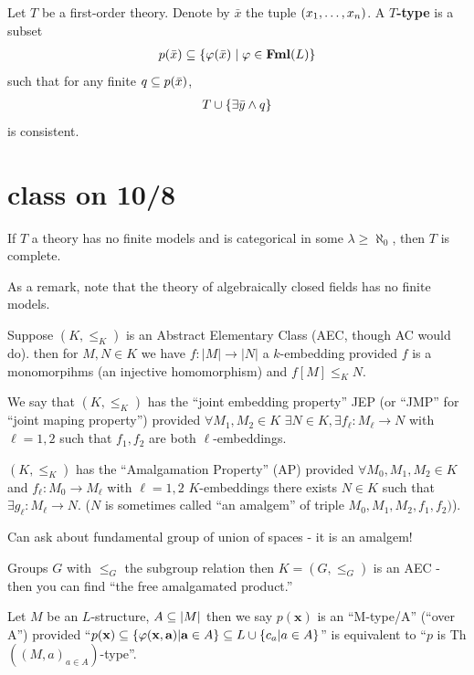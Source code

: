 \begin{boxdefinition}[$T$-Type]
    Let $T$ be a first-order theory. Denote by $\bar{x}$ the tuple $\left( x_1, \ldots, x_n \right)$. A \textbf{$T$-type} is a subset
    \begin{align*}
        p\!\left( \bar{x} \right) \subseteq \left\{ \varphi\!\left( \bar{x} \right) \; \middle\vert \; \varphi \in \mathbf{Fml}(L) \right\}
    \end{align*}
    such that for any finite $q \subseteq p\!\left( \bar{x} \right)$,
    \begin{align*}
        T \cup \left\{ \exists \bar{y} \land q \right\}
    \end{align*}
    is consistent.
\end{boxdefinition}
\section{class on 10/8}
\begin{boxtheorem}[Vaught]
    If $T$ a theory has no finite models and is categorical in some $\lambda\geq \aleph_0$, then $T$ is complete.
\end{boxtheorem}
As a remark, note that the theory of algebraically closed fields has no finite models.
\begin{boxdefinition}
    Suppose $(K, \leq_K)$ is an Abstract Elementary Class (AEC, though AC would do). then for $M,N\in K$ we have $f:|M|\rightarrow |N|$ a $k$-embedding provided $f$ is a monomorpihms (an injective homomorphism) and $f[M]\leq_K N$.
\end{boxdefinition}
\begin{boxdefinition}
    We say that $(K, \leq_K)$ has the ``joint embedding property'' JEP (or ``JMP'' for ``joint maping property'') provided $\forall M_1, M_2\in K$ $\exists N\in K, \exists f_{\ell}:M_{\ell}\rightarrow N$ with $\ell=1,2$ such that $f_1, f_2$ are both $\ell$-embeddings.
\end{boxdefinition}
\begin{boxdefinition}
    $(K, \leq_K)$ has the ``Amalgamation Property'' (AP) provided $\forall M_0, M_1, M_2\in K$ and $f_{\ell}:M_0\rightarrow M_{\ell}$ with $\ell=1,2$ $K$-embeddings there exists $N\in K$ such that $\exists g_{\ell}:M_{\ell}\rightarrow N$. ($N$ is sometimes called ``an amalgem'' of triple $M_0, M_1, M_2, f_1, f_2)$).
\end{boxdefinition}
Can ask about fundamental group of union of spaces - it is an amalgem!

Groups $G$ with $\leq_G$ the subgroup relation then $K=(G, \leq_G)$ is an AEC - then you can find ``the free amalgamated product.''
\begin{boxdefinition}
    Let $M$ be an $L$-structure, $A\subseteq |M|$ then we say $p(\textbf{x})$ is an ``M-type/A'' (``over A'') provided ``$p(\textbf{x})\subseteq \{\varphi(\textbf{x}, \textbf{a})|\textbf{a}\in A\}\subseteq L\cup \{c_a|a\in A\}$'' is equivalent to ``$p$ is Th$((M,a)_{a\in A})$-type''.
\end{boxdefinition}


